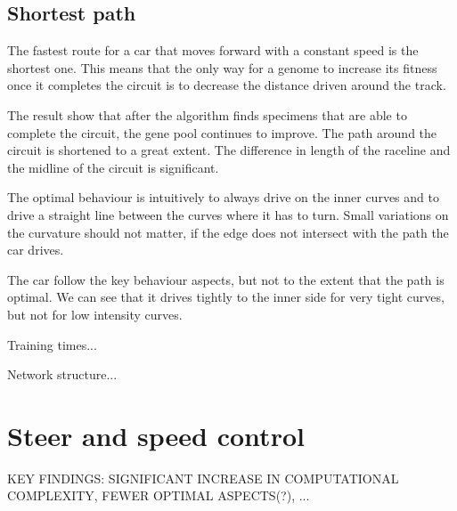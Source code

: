 \subsection{Shortest path}

The fastest route for a car that moves forward with a constant speed is the shortest one. This means that the only way for a genome to increase its fitness once it completes the circuit is to decrease the distance driven around the track.  

The result show that after the algorithm finds specimens that are able to complete the circuit, the gene pool continues to improve. The path around the circuit is shortened to a great extent. The difference in length of the raceline and the midline of the circuit is significant. 

The optimal behaviour is intuitively to always drive on the inner curves and to drive a straight line between the curves where it has to turn. Small variations on the curvature should not matter, if the edge does not intersect with the path the car drives.

The car follow the key behaviour aspects, but not to the extent that the path is optimal. We can see that it drives tightly to the inner side for very tight curves, but not for low intensity curves.

Training times...

Network structure...



\section{Steer and speed control}
KEY FINDINGS: SIGNIFICANT INCREASE IN COMPUTATIONAL COMPLEXITY, FEWER OPTIMAL ASPECTS(?), ...



%

